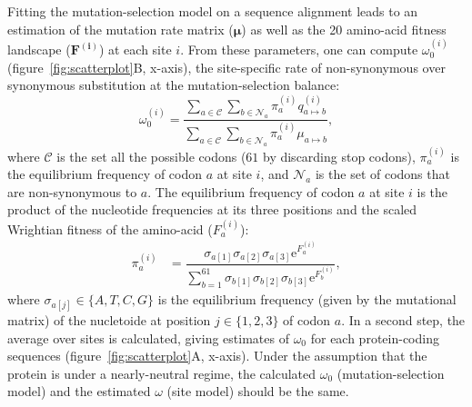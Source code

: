 \documentclass{article}
\newcommand{\UniDimArray}[1]{\bm{#1}}
\newcommand{\e}{\mathrm{e}}
\begin{document}
    Fitting the mutation-selection model on a sequence alignment leads to an estimation of the mutation rate matrix ($\UniDimArray{\mu}$) as well as the 20 amino-acid fitness landscape ($\UniDimArray{F^{(i)}}$) at each site $i$.
    From these parameters, one can compute $\omega_{0}^{(i)}$ (figure~\ref{fig:scatterplot}B, x-axis), the site-specific rate of non-synonymous over synonymous substitution at the mutation-selection balance:
    \begin{equation}
        \omega_{0}^{(i)} = \dfrac{\sum_{a \in \mathcal{C}} \sum_{b \in \mathcal{N}_a} \pi_a^{(i)} q_{a \mapsto b}^{(i)}}{\sum_{a \in \mathcal{C}} \sum_{b \in \mathcal{N}_a} \pi_a^{(i)} \mu_{a \mapsto b}},
    \end{equation}
    where $\mathcal{C}$ is the set all the possible codons ($61$ by discarding stop codons), $\pi_a^{(i)}$ is the equilibrium frequency of codon $a$ at site $i$, and $\mathcal{N}_a$ is the set of codons that are non-synonymous to $a$\cite{spielman_relationship_2015, rodrigue_detecting_2017}.
    The equilibrium frequency of codon $a$ at site $i$ is the product of the nucleotide frequencies at its three positions and the scaled Wrightian fitness of the amino-acid ($F_a^{(i)}$):
    \begin{align}
        \pi_a^{(i)} & = \dfrac{ \sigma_{a[1]}\sigma_{a[2]}\sigma_{a[3]} \e^{F_a^{(i)}}}{\sum\limits_{b=1}^{61}\sigma_{b[1]}\sigma_{b[2]}\sigma_{b[3]} \e^{F_b^{(i)}} },
    \end{align}
    where $\sigma_{a[j]} \in \{A, T, C, G\}$ is the equilibrium frequency (given by the mutational matrix) of the nucletoide at position $j \in \{1, 2, 3\}$ of codon $a$.
    In a second step, the average over sites is calculated, giving estimates of $\omega_{0}$ for each protein-coding sequences (figure~\ref{fig:scatterplot}A, x-axis).
    Under the assumption that the protein is under a nearly-neutral regime, the calculated $\omega_{0}$ (mutation-selection model) and the estimated $\omega$ (site model) should be the same\cite{spielman_relationship_2015}.
\end{document}

